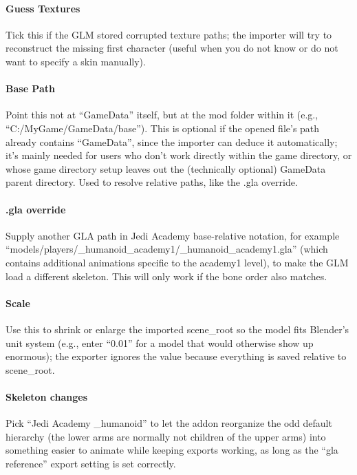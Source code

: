 \documentclass[a4paper,10pt]{article}
\begin{document}
\paragraph*{Guess Textures}
Tick this if the GLM stored corrupted texture paths; the importer will try to reconstruct the missing first
character (useful when you do not know or do not want to specify a skin manually).

\paragraph*{Base Path}
Point this not at ``GameData'' itself, but at the mod folder within it (e.g., ``C:/MyGame/GameData/base''). This is
optional if the opened file's path already contains ``GameData'', since the importer can deduce it automatically;
it's mainly needed for users who don't work directly within the game directory, or whose game directory setup
leaves out the (technically optional) GameData parent directory. Used to resolve relative paths, like the .gla override.

\paragraph*{.gla override}
Supply another GLA path in Jedi Academy base-relative notation, for example
``models/players/\_humanoid\_academy1/\_humanoid\_academy1.gla'' (which contains additional animations specific
to the academy1 level), to make the GLM load a different skeleton. This will only work if the bone order also
matches.

\paragraph*{Scale}
Use this to shrink or enlarge the imported scene\_root so the model fits Blender's unit system (e.g., enter
``0.01'' for a model that would otherwise show up enormous); the exporter ignores the value because everything
is saved relative to scene\_root.

\paragraph*{Skeleton changes}
Pick ``Jedi Academy \_humanoid'' to let the addon reorganize the odd default hierarchy (the lower arms are
normally not children of the upper arms) into something easier to animate while keeping exports working, as long
as the ``gla reference'' export setting is set correctly.
\end{document}
